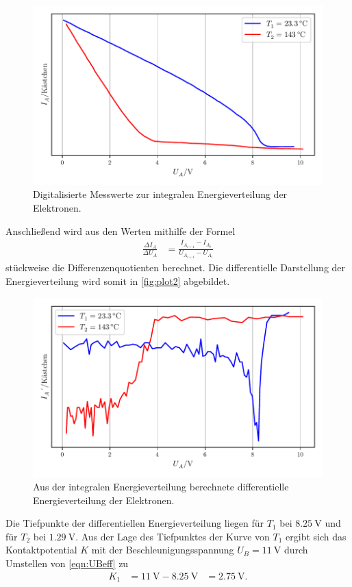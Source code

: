 \begin{figure}[H]
  \centering
  \includegraphics[width=\textwidth]{build/plot1.pdf}
  \caption {Digitalisierte Messwerte zur integralen Energieverteilung der Elektronen.}
  \label{fig:plot1}
\end{figure}

Anschließend wird aus den Werten mithilfe der Formel
\begin{align*}
  \frac{\Delta I_A}{\Delta U_A} &= \frac{I_A_{i+1}-I_A_i}{U_A_{i+1}-U_A_i}\label{eqn:diffquo}
\end{align*}
stückweise die Differenzenquotienten berechnet.
Die differentielle Darstellung der Energieverteilung wird somit in \autoref{fig:plot2} abgebildet.

\begin{figure}[H]
  \centering
  \includegraphics[width=\textwidth]{build/plot2.pdf}
  \caption {Aus der integralen Energieverteilung berechnete differentielle Energieverteilung der Elektronen.}
  \label{fig:plot2}
\end{figure}
Die Tiefpunkte der differentiellen Energieverteilung liegen für $T_1$ bei $\qty{8.25}{\volt}$ und für $T_2$ bei $\qty{1.29}{\volt}$.
Aus der Lage des Tiefpunktes der Kurve von $T_1$ ergibt sich das Kontaktpotential $K$ mit der Beschleunigungsspannung $U_B= \qty{11}{\volt}$
durch Umstellen von \autoref{eqn:UBeff} zu
\begin{align*}
  K_1 &= \qty{11}{\volt}-\qty{8.25}{\volt} &= \qty{2.75}{\volt}.\\
\end{align*}

